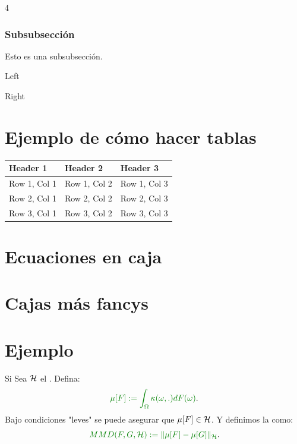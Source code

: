\documentclass[landscape, letterpaper]{article}
\def\cols{4}
\begin{document}
\begin{multicols*}{\cols}
    \subsubsection{Subsubsección}
    Esto es una subsubsección.

    \begin{minipage}{0.49\linewidth}
        Left
    \end{minipage}
    \hfill
    \begin{minipage}{0.49\linewidth}
       Right
    \end{minipage}

    \section{Ejemplo de cómo hacer tablas}
    \begin{tabularx}{\linewidth}{|X|X|X|}
        \hline
        \textbf{Header 1} & \textbf{Header 2} & \textbf{Header 3} \\
        \hline
        Row 1, Col 1 & Row 1, Col 2 & Row 1, Col 3 \\
        \hline
        Row 2, Col 1 & Row 2, Col 2 & Row 2, Col 3 \\
        \hline
        Row 3, Col 1 & Row 3, Col 2 & Row 3, Col 3 \\
        \hline
    \end{tabularx}

    \section{Ecuaciones en caja}
    
    \section{Cajas más fancys}

    \section{Ejemplo}
    
    \begin{defi}
    Si  Sea $\mathcal{H}$ el . Defina:
    \[
    \df{\mu[F]:= \int_\Om \kappa(\om, . ) dF(\om)}.
    \]
    Bajo condiciones "leves" se puede asegurar que $\mu[F] \in \mathcal{H}$. Y definimos la  como:
    \[
    \df{MMD(F,G,\hc):= \| \mu[F]- \mu[G]\|_\hc}.
    \]
\end{defi}


\end{multicols*}
\end{document}

